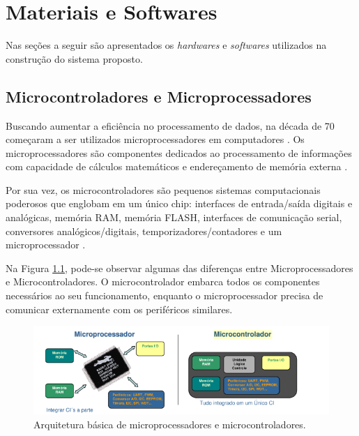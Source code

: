 \chapter{Materiais e Softwares}
Nas seções a seguir são apresentados os \textit{hardwares} e \textit{softwares} utilizados na construção do sistema proposto.
\section{Microcontroladores e Microprocessadores}

Buscando aumentar a eficiência no processamento de dados, na década de 70
começaram a ser utilizados microprocessadores em computadores \cite{martins2005sistemas}. Os microprocessadores são componentes dedicados ao processamento de informações com
capacidade de cálculos matemáticos e endereçamento de memória externa \cite{chase2007sistemas}.

Por sua vez, os microcontroladores são pequenos sistemas computacionais poderosos que englobam em um único chip: interfaces de entrada/saída digitais e analógicas, memória RAM, memória FLASH, interfaces de comunicação serial, conversores analógicos/digitais, temporizadores/contadores e um microprocessador \cite{chase2007sistemas}.

Na Figura \ref{fig:microprocessador-microcontrolador}, pode-se observar algumas das diferenças entre Microprocessadores e Microcontroladores. O microcontrolador embarca todos os componentes necessários ao seu funcionamento, enquanto o microprocessador precisa de comunicar externamente com os periféricos similares.

\begin{figure}[htbp]
	\centering
	\includegraphics[scale=0.7]{figuras/processa-controla.png}
	\caption{Arquitetura básica de microprocessadores e microcontroladores.}
	\label{fig:microprocessador-microcontrolador}
\end{figure}

\newpage

%
%



